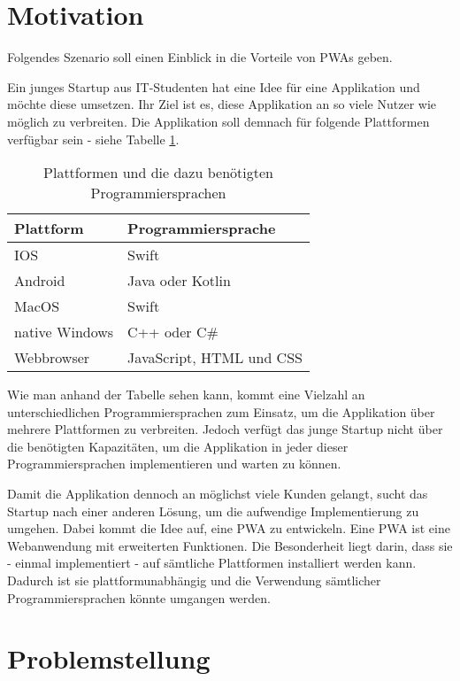 
\section{Motivation} \label{se:Motivation}

Folgendes Szenario soll einen Einblick in die Vorteile von \ac{PWAs} geben. 

Ein junges Startup aus IT-Studenten hat eine Idee für eine Applikation und möchte diese umsetzen. Ihr Ziel ist es, diese Applikation an so viele Nutzer wie möglich zu verbreiten. Die Applikation soll demnach für folgende Plattformen verfügbar sein - siehe Tabelle \ref{plattformen}.

\begin{table}[!htb]
\begin{tabularx}{\textwidth}{|X|X|}
    \hline
    \textbf{Plattform} & \textbf{Programmiersprache} \\
    \hline
    \hline
    IOS & Swift \\
    \hline
    Android & Java oder Kotlin\\
    \hline
    MacOS & Swift \\
    \hline 
    native Windows & C++ oder C\# \\
    \hline
    Webbrowser & JavaScript, HTML und CSS \\
    \hline
\end{tabularx}
\caption{Plattformen und die dazu benötigten Programmiersprachen}
\label{plattformen}
\end{table}

Wie man anhand der Tabelle sehen kann, kommt eine Vielzahl an unterschiedlichen Programmiersprachen zum Einsatz, um die Applikation über mehrere Plattformen zu verbreiten. Jedoch verfügt das junge Startup nicht über die benötigten Kapazitäten, um die Applikation in jeder dieser Programmiersprachen implementieren und warten zu können. 

Damit die Applikation dennoch an möglichst viele Kunden gelangt, sucht das Startup nach einer anderen Lösung, um die aufwendige Implementierung zu umgehen. Dabei kommt die Idee auf, eine \ac{PWA} zu entwickeln. Eine PWA ist eine Webanwendung mit erweiterten Funktionen. Die Besonderheit liegt darin, dass sie - einmal implementiert - auf sämtliche Plattformen installiert werden kann. Dadurch ist sie plattformunabhängig und die Verwendung sämtlicher Programmiersprachen könnte umgangen werden.


\section{Problemstellung}

